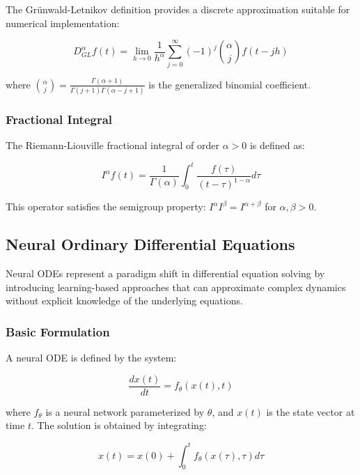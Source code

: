 The Grünwald-Letnikov definition provides a discrete approximation suitable for numerical implementation:

\begin{equation}
D^{\alpha}_{GL} f(t) = \lim_{h \to 0} \frac{1}{h^{\alpha}} \sum_{j=0}^{\infty} (-1)^j \binom{\alpha}{j} f(t-jh)
\end{equation}

where $\binom{\alpha}{j} = \frac{\Gamma(\alpha+1)}{\Gamma(j+1)\Gamma(\alpha-j+1)}$ is the generalized binomial coefficient.

\subsubsection{Fractional Integral}

The Riemann-Liouville fractional integral of order $\alpha > 0$ is defined as:

\begin{equation}
I^{\alpha} f(t) = \frac{1}{\Gamma(\alpha)} \int_0^t \frac{f(\tau)}{(t-\tau)^{1-\alpha}} d\tau
\end{equation}

This operator satisfies the semigroup property: $I^{\alpha} I^{\beta} = I^{\alpha+\beta}$ for $\alpha, \beta > 0$.

\subsection{Neural Ordinary Differential Equations}

Neural ODEs represent a paradigm shift in differential equation solving by introducing learning-based approaches that can approximate complex dynamics without explicit knowledge of the underlying equations.

\subsubsection{Basic Formulation}

A neural ODE is defined by the system:

\begin{equation}
\frac{dx(t)}{dt} = f_\theta(x(t), t)
\end{equation}

where $f_\theta$ is a neural network parameterized by $\theta$, and $x(t)$ is the state vector at time $t$. The solution is obtained by integrating:

\begin{equation}
x(t) = x(0) + \int_0^t f_\theta(x(\tau), \tau) d\tau
\end{equation}


